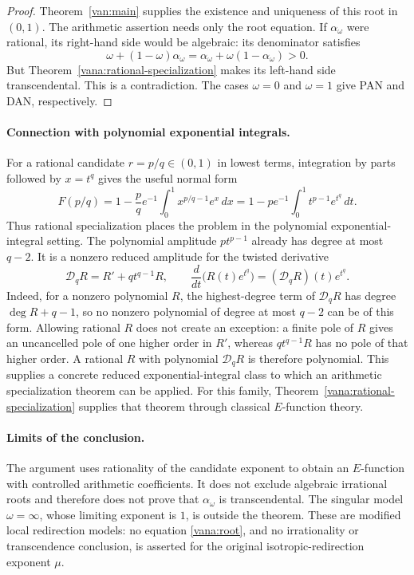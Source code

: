 \begin{proof}
Theorem~\ref{van:main} supplies the existence and uniqueness of
this root in $(0,1)$.  The arithmetic assertion needs
only the root equation.  If $\alpha_\omega$ were rational, its
right-hand side would be algebraic: its denominator satisfies
\[
 \omega+(1-\omega)\alpha_\omega
 =\alpha_\omega+\omega(1-\alpha_\omega)>0.
\]
But Theorem~\ref{vana:rational-specialization} makes its left-hand
side transcendental.  This is a contradiction.  The cases
$\omega=0$ and $\omega=1$ give PAN and DAN, respectively.
\end{proof}

\paragraph{Connection with polynomial exponential integrals.}
For a rational candidate $r=p/q\in(0,1)$ in lowest terms, integration
by parts followed by $x=t^q$ gives the useful normal form
\begin{equation}\label{vana:EIT-form}
 F(p/q)
 =1-\frac pq e^{-1}\int_0^1 x^{p/q-1}e^x\,dx
 =1-p e^{-1}\int_0^1 t^{p-1}e^{t^q}\,dt.
\end{equation}
Thus rational specialization places the problem in the polynomial
exponential-integral setting.  The polynomial amplitude
$p t^{p-1}$ already has degree at most $q-2$.  It is a nonzero
reduced amplitude for the twisted derivative
\[
 \mathcal D_q R=R'+q t^{q-1}R,
 \qquad
 \frac{d}{dt}\bigl(R(t)e^{t^q}\bigr)
       =(\mathcal D_qR)(t)e^{t^q}.
\]
Indeed, for a nonzero polynomial $R$, the highest-degree term of
$\mathcal D_qR$ has degree $\deg R+q-1$, so no nonzero polynomial
of degree at most $q-2$ can be of this form.  Allowing rational $R$
does not create an exception: a finite pole of $R$ gives an
uncancelled pole of one higher order in $R'$, whereas
$q t^{q-1}R$ has no pole of that higher order.  A rational
$R$ with polynomial $\mathcal D_qR$ is therefore polynomial.
This supplies a concrete reduced exponential-integral class to
which an arithmetic specialization theorem can be applied.
For this family, Theorem~\ref{vana:rational-specialization} supplies
that theorem through classical $E$-function theory.

\paragraph{Limits of the conclusion.}
The argument uses rationality of the candidate exponent to obtain an
$E$-function with controlled arithmetic coefficients.  It does not
exclude algebraic irrational roots and therefore does not prove that
$\alpha_\omega$ is transcendental.  The singular model
$\omega=\infty$, whose limiting exponent is $1$, is outside the
theorem.  These are modified local redirection models: no equation
\eqref{vana:root}, and no irrationality or transcendence conclusion,
is asserted for the original isotropic-redirection exponent $\mu$.

